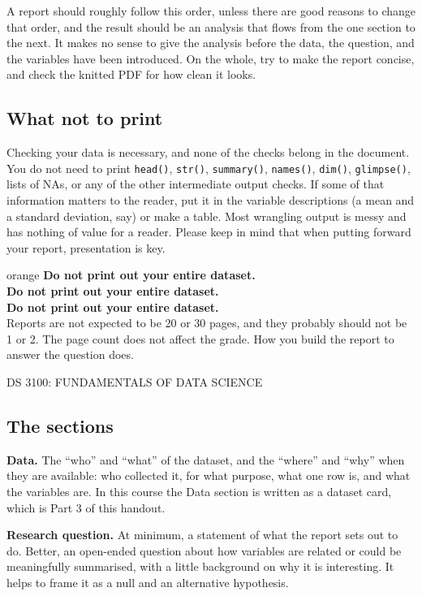 \documentclass[11pt,letterpaper]{article}
\newcommand{\coursehead}{%
  {\sffamily\fontsize{7.5}{9}\selectfont\MakeUppercase{DS 3100: FUNDAMENTALS OF DATA SCIENCE}}%
}
\newcommand{\warningbox}[1]{%
  \begin{callout}[title={\sffamily\fontsize{7.5}{9}\selectfont\color{accent}\MakeUppercase{WARNING}}]{orange}
  #1
  \end{callout}%
}
\newcommand{\code}[1]{\texttt{#1}}
\begin{document}
A report should roughly follow this order, unless there are good reasons to change that order, and the result should be an analysis that flows from the one section to the next. It makes no sense to give the analysis before the data, the question, and the variables have been introduced. On the whole, try to make the report concise, and check the knitted PDF for how clean it looks.

\subsection*{What not to print}
Checking your data is necessary, and none of the checks belong in the document. You do not need to print \code{head()}, \code{str()}, \code{summary()}, \code{names()}, \code{dim()}, \code{glimpse()}, lists of NAs, or any of the other intermediate output checks. If some of that information matters to the reader, put it in the variable descriptions (a mean and a standard deviation, say) or make a table. Most wrangling output is messy and has nothing of value for a reader. Please keep in mind that when putting forward your report, presentation is key.\\

\warningbox{\textbf{Do not print out your entire dataset.}\\
\textbf{Do not print out your entire dataset.}\\
\textbf{Do not print out your entire dataset.}\\
Reports are not expected to be 20 or 30 pages, and they probably should not be 1 or 2. The page count does not affect the grade. How you build the report to answer the question does.}

\clearpage

\coursehead

\subsection*{The sections}
\textbf{Data.} The “who” and “what” of the dataset, and the “where” and “why” when they are available: who collected it, for what purpose, what one row is, and what the variables are. In this course the Data section is written as a dataset card, which is Part 3 of this handout.

\textbf{Research question.} At minimum, a statement of what the report sets out to do. Better, an open-ended question about how variables are related or could be meaningfully summarised, with a little background on why it is interesting. It helps to frame it as a null and an alternative hypothesis.
\end{document}
